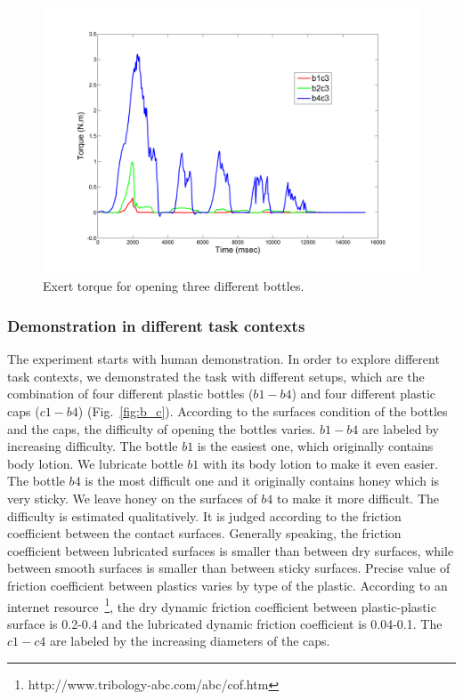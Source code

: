 \begin{figure}
  \centering
  \includegraphics[width=12cm]{./fig_cha4/b1b3b4_time_T_2.pdf}
  \caption{ \scriptsize{Exert torque for opening three different bottles.}
}
\label{fig:bottlepatterns}
\end{figure}


\subsubsection{Demonstration in different task contexts}
\label{cha4:sec3:taskcontexts}
The experiment starts with human demonstration. In order to explore different task contexts, we demonstrated the task with different setups, which are the combination of four different plastic bottles ($b1-b4$) and four different plastic caps ($c1-b4$) (Fig.~\ref{fig:b_c}).
According to the surfaces condition of the bottles and the caps, the difficulty of opening the bottles varies. $b1-b4$ are labeled by increasing difficulty. The bottle $b1$ is the easiest one, which originally contains body lotion. We lubricate bottle $b1$ with its body lotion to make it even easier. The bottle $b4$ is the most difficult one and it originally contains honey which is very sticky. We leave honey on the surfaces of $b4$ to make it more difficult. The difficulty is estimated qualitatively. It is judged according to the friction coefficient between the contact surfaces. Generally speaking, the friction coefficient between lubricated surfaces is smaller than between dry surfaces, while between smooth  surfaces is smaller than between sticky surfaces. Precise value of friction coefficient between plastics varies by type of the plastic. According to an internet resource~\footnote{http://www.tribology-abc.com/abc/cof.htm}, the dry dynamic friction coefficient between plastic-plastic surface is 0.2-0.4 and the lubricated dynamic friction coefficient is 0.04-0.1. The $c1-c4$ are labeled by the increasing diameters of the caps.


